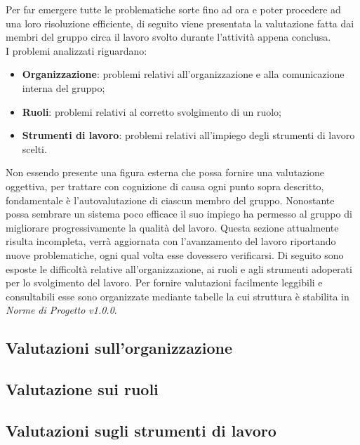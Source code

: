 Per far emergere tutte le problematiche sorte fino ad ora e poter procedere 
ad una loro risoluzione efficiente, di seguito viene presentata la valutazione 
fatta dai membri del gruppo {\Gruppo} circa il lavoro svolto durante l’attività appena conclusa. \\
I problemi analizzati riguardano:

\begin{itemize}
	\item \textbf{Organizzazione}: problemi relativi all’organizzazione e alla comunicazione interna del gruppo;
	\item \textbf{Ruoli}: problemi relativi al corretto svolgimento di un ruolo;
	\item \textbf{Strumenti di lavoro}: problemi relativi all’impiego degli strumenti di lavoro scelti.
\end{itemize}

Non essendo presente una figura esterna che possa fornire una valutazione oggettiva, per trattare con cognizione 
di causa ogni punto sopra descritto, fondamentale è l’autovalutazione di ciascun membro del gruppo. Nonostante possa 
sembrare un sistema poco efficace il suo impiego ha permesso al gruppo di migliorare progressivamente la qualità del lavoro. 
Questa sezione attualmente risulta incompleta, verrà aggiornata con l’avanzamento del lavoro riportando nuove problematiche, 
ogni qual volta esse dovessero verificarsi. Di seguito sono esposte le difficoltà relative all’organizzazione, ai ruoli e agli strumenti 
adoperati per lo svolgimento del lavoro. Per fornire valutazioni facilmente leggibili e consultabili esse sono organizzate mediante tabelle 
la cui struttura è stabilita in \textit{Norme di Progetto v1.0.0}. 

\subsection{Valutazioni sull'organizzazione}


\subsection{Valutazione sui ruoli}


\subsection{Valutazioni sugli strumenti di lavoro}
